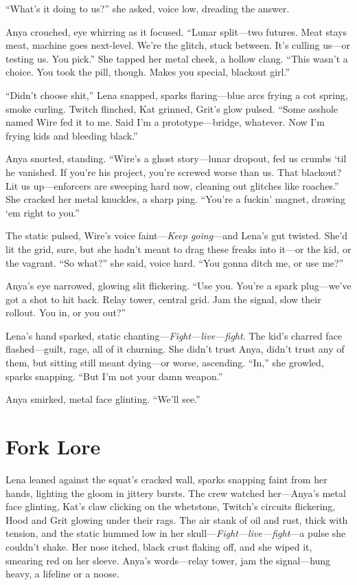 \documentclass[12pt]{book}
\begin{document}
``What’s it doing to us?'' she asked, voice low, dreading the answer.

Anya crouched, eye whirring as it focused. ``Lunar split---two futures. Meat stays meat, machine goes next-level. We’re the glitch, stuck between. It’s culling us---or testing us. You pick.'' She tapped her metal cheek, a hollow clang. ``This wasn’t a choice. You took the pill, though. Makes you special, blackout girl.''

``Didn’t choose shit,'' Lena snapped, sparks flaring---blue arcs frying a cot spring, smoke curling. Twitch flinched, Kat grinned, Grit’s glow pulsed. ``Some asshole named Wire fed it to me. Said I’m a prototype---bridge, whatever. Now I’m frying kids and bleeding black.''

Anya snorted, standing. ``Wire’s a ghost story---lunar dropout, fed us crumbs ‘til he vanished. If you’re his project, you’re screwed worse than us. That blackout? Lit us up---enforcers are sweeping hard now, cleaning out glitches like roaches.'' She cracked her metal knuckles, a sharp ping. ``You’re a fuckin’ magnet, drawing ‘em right to you.''

The static pulsed, Wire’s voice faint---\emph{Keep going}---and Lena’s gut twisted. She’d lit the grid, sure, but she hadn’t meant to drag these freaks into it---or the kid, or the vagrant. ``So what?'' she said, voice hard. ``You gonna ditch me, or use me?''

Anya’s eye narrowed, glowing slit flickering. ``Use you. You’re a spark plug---we’ve got a shot to hit back. Relay tower, central grid. Jam the signal, slow their rollout. You in, or you out?''

Lena’s hand sparked, static chanting---\emph{Fight---live---fight}. The kid’s charred face flashed---guilt, rage, all of it churning. She didn’t trust Anya, didn’t trust any of them, but sitting still meant dying---or worse, ascending. ``In,'' she growled, sparks snapping. ``But I’m not your damn weapon.''

Anya smirked, metal face glinting. ``We’ll see.''

\section{Fork Lore}

Lena leaned against the squat’s cracked wall, sparks snapping faint from her hands, lighting the gloom in jittery bursts. The crew watched her---Anya’s metal face glinting, Kat’s claw clicking on the whetstone, Twitch’s circuits flickering, Hood and Grit glowing under their rags. The air stank of oil and rust, thick with tension, and the static hummed low in her skull---\emph{Fight---live---fight}---a pulse she couldn’t shake. Her nose itched, black crust flaking off, and she wiped it, smearing red on her sleeve. Anya’s words---relay tower, jam the signal---hung heavy, a lifeline or a noose.
\end{document}
